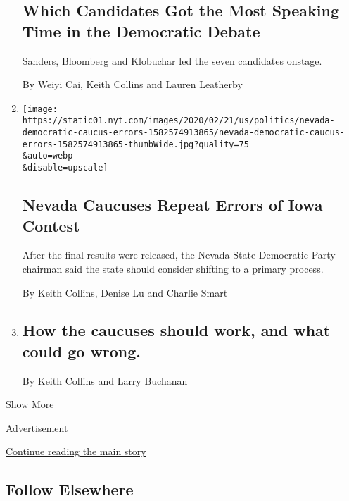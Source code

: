 \begin{enumerate}
  \hypertarget{which-candidates-got-the-most-speaking-time-in-the-democratic-debate}{%
  \subsection{Which Candidates Got the Most Speaking Time in the
  Democratic
  Debate}\label{which-candidates-got-the-most-speaking-time-in-the-democratic-debate}}

  Sanders, Bloomberg and Klobuchar led the seven candidates onstage.

  By Weiyi Cai, Keith Collins and Lauren Leatherby
\item
  \href{/interactive/2020/02/24/us/politics/nevada-democratic-caucus-errors.html}{}

  \texttt{[image: https://static01.nyt.com/images/2020/02/21/us/politics/nevada-democratic-caucus-errors-1582574913865/nevada-democratic-caucus-errors-1582574913865-thumbWide.jpg?quality=75\\\&auto=webp\\\&disable=upscale]}

  \hypertarget{nevada-caucuses-repeat-errors-of-iowa-contest}{%
  \subsection{Nevada Caucuses Repeat Errors of Iowa
  Contest}\label{nevada-caucuses-repeat-errors-of-iowa-contest}}

  After the final results were released, the Nevada State Democratic
  Party chairman said the state should consider shifting to a primary
  process.

  By Keith Collins, Denise Lu and Charlie Smart
\item
  \href{/live/2020/nevada-caucus-02-22/how-caucuses-work}{}

  \hypertarget{how-the-caucuses-should-work-and-what-could-go-wrong}{%
  \subsection{How the caucuses should work, and what could go
  wrong.}\label{how-the-caucuses-should-work-and-what-could-go-wrong}}

  By Keith Collins and Larry Buchanan
\end{enumerate}

Show More

Advertisement

\protect\hyperlink{after-mid2}{Continue reading the main story}

\hypertarget{follow-elsewhere}{%
\subsection{Follow Elsewhere}\label{follow-elsewhere}}


